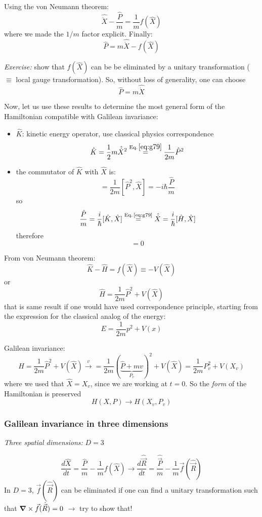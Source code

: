 \documentclass[12pt]{article}
\newcommand{\be}{\begin{equation}}
\newcommand{\ee}{\end{equation}}
\begin{document}
Using the von Neumann theorem:
\be
\hat{\dot{X}} - \frac{\hat{P}}{m} = \frac{1}{m} f(\hat{X})
\ee
where we made the $1/m$ factor explicit. Finally:
\setcounter{equation}{77}
\be
\hat{P} = m\hat{\dot{X}} - f(\hat{X})
\ee

 \emph{Exercise:} show that $f(\hat{X})$ can be
be eliminated by a unitary transformation 
($\equiv$ local gauge transformation).
So, without loss of generality, one can choose
\be
\hat{P} = m \hat{\dot{X}}
\label{eq:g79}
\ee

Now, let us use these results to determine the
most general form of the Hamiltonian compatible
with Galilean invariance:
\begin{itemize}
\item $\hat{K}$: kinetic energy operator, use classical physics
correspondence
\be
\hat{K} = \frac{1}{2} m \hat{\dot{X}}^2
\stackrel{\text{Eq.\,}\eqref{eq:g79}}{=} \frac{1}{2m} \hat{P}^2
\ee
\item the commutator of $\hat{K}$ with $\hat{X}$ is:
\be
[\hat{K},\hat{X}] = \frac{1}{2m}
[\hat{P}^2,\hat{X}] = -i\hbar\frac{\hat{P}}{m}
\ee
so
\be
\frac{\hat{P}}{m} = \frac{i}{\hbar} [\hat{K},\hat{X}]
\stackrel{\text{Eq.\,\eqref{eq:g79}}}{=}
\hat{\dot{X}} = \frac{i}{\hbar}[\hat{H},\hat{X}]
\ee
therefore
\be
[\hat{K}-\hat{H},\hat{X}] = 0
\ee
\end{itemize}
From von Neumann theorem:
\be
\hat{K}-\hat{H} = f(\hat{X}) \equiv -V(\hat{X})
\ee
or
\be
\hat{H} = \frac{1}{2m} \hat{P}^2 + V(\hat{X})
\ee
that is same result if one would have used correspondence
principle, starting from the expression for the
classical analog of the energy:
\be
E = \frac{1}{2m} p^2 + V(x)
\ee

Galilean invariance:
\[
H = \frac{1}{2m} \hat{P}^2 + V(\hat{X}) \xrightarrow{v}
= \frac{1}{2m} (
\underbrace{\hat{P}+mv}_{P_v})^2 + V(\hat{X})
= \frac{1}{2m} P_v^2 + V(X_v)
\]
where we used that $\hat{X} = X_v$, since we are working at $t=0$.
So the \emph{form} of the Hamiltonian is preserved
\be
H(X,P) \to H(X_v,P_v)
\ee

\subsubsection{Galilean invariance in three dimensions}

\emph{Three spatial dimensions:} $D = 3$

\be
\frac{d\hat{X}}{dt} = \frac{\hat{P}}{m} - \frac{1}{m} f(\hat{X}) \to
\frac{d\hat{\vec{R}}}{dt} = \frac{\hat{\vec{P}}}{m} - \frac{1}{m} \vec{f}(\hat{\vec{R}}) 
\ee
In $D = 3$, $\vec{f}(\hat{\vec{R}})$ can be eliminated if one can
find a unitary transformation such that
$\grad \times \vec{f}(\hat{\vec{R}})= 0$ $\to$ try to show that!
\end{document}
